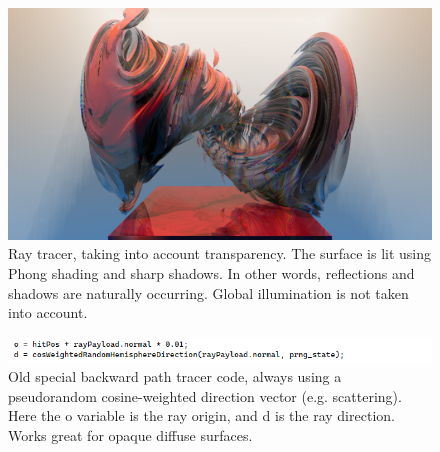 \documentclass[12pt]{article}
\begin{document}
\begin{figure} 
\centering
  \includegraphics[width = 6 in]{fig2.png}
  \caption{ Ray tracer, taking into account transparency.
The surface is lit using Phong shading and sharp shadows.
In other words, reflections and shadows are naturally occurring.
Global illumination is not taken into account.
}
\end{figure}




\begin{figure} 
\centering
  \includegraphics[width = 6 in]{fig3.png}
  \caption{ Old special backward path tracer code, always using a pseudorandom cosine-weighted direction vector (e.g. scattering).
Here the o variable is the ray origin, and d is the ray direction.
Works great for opaque diffuse surfaces.
}
\end{figure}
\end{document}
